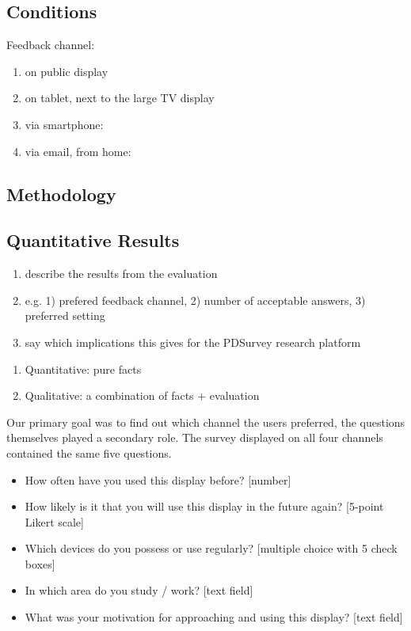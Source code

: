 \subsection{Conditions}

	Feedback channel: 
	\begin{enumerate}
	\item on public display
	\item on tablet, next to the large TV display
	\item via smartphone: 
	\item via email, from home:
	\end{enumerate}


\subsection{Methodology}



\subsection{Quantitative Results}

	\begin{enumerate}
	\item describe the results from the evaluation
	\item e.g. 1) prefered feedback channel, 2) number of acceptable answers, 3) preferred setting
	\item say which implications this gives for the PDSurvey research platform
	\end{enumerate}

	\begin{enumerate}
	\item Quantitative: pure facts
	\item Qualitative: a combination of facts + evaluation
	\end{enumerate}


	Our primary goal was to find out which channel the users preferred, the questions themselves played a secondary role. The survey displayed on all four channels contained the same five questions. 

	\begin{itemize}
	\item How often have you used this display before? [number]
	\item How likely is it that you will use this display in the future again? [5-point Likert scale]
	\item Which devices do you possess or use regularly? [multiple choice with 5 check boxes]
	\item In which area do you study / work? [text field]
	\item What was your motivation for approaching and using this display? [text field]
	\end{itemize}

